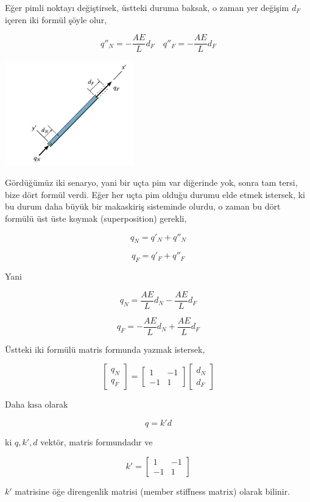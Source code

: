 \documentclass[12pt,fleqn]{article}\usepackage{../../common}
\begin{document}
Eğer pimli noktayı değiştirsek, üstteki duruma baksak, o zaman yer değişim
$d_F$ içeren iki formül şöyle olur,

$$
q''_N = - \frac{AE}{L} d_F \quad
q''_F = - \frac{AE}{L} d_F 
$$

\includegraphics[width=15em]{phy_020_strs_05_08.jpg}

Gördüğümüz iki senaryo, yani bir uçta pim var diğerinde yok, sonra tam tersi,
bize dört formül verdi. Eğer her uçta pim olduğu durumu elde etmek istersek, ki
bu durum daha büyük bir makaskiriş sisteminde olurdu, o zaman bu dört formülü
üst üste koymak (superposition) gerekli,

$$
q_N = q'_N + q''_N 
$$

$$
q_F = q'_F + q''_F
$$

Yani

$$
q_N = \frac{AE}{L} d_N - \frac{AE}{L} d_F
$$

$$
q_F = -\frac{AE}{L} d_N + \frac{AE}{L} d_F
$$

Üstteki iki formülü matris formunda yazmak istersek,

$$
\left[\begin{array}{c}
q_N \\ q_F
\end{array}\right] =
\left[\begin{array}{cc}
1 & -1 \\ -1 & 1
\end{array}\right]
\left[\begin{array}{c}
d_N \\ d_F
\end{array}\right] 
$$

Daha kısa olarak

$$
q = k' d
$$

ki $q,k',d$ vektör, matris formundadır ve

$$
k' = \left[\begin{array}{cc}
1 & -1 \\ -1 & 1
\end{array}\right]
$$

$k'$ matrisine öğe direngenlik matrisi (member stiffness matrix) olarak bilinir.
\end{document}
